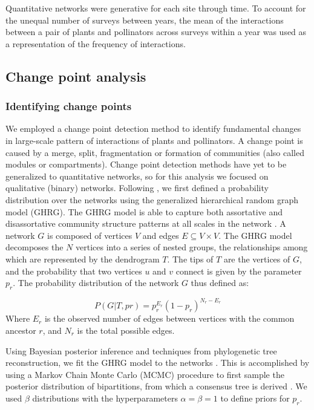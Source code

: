 \documentclass[12pt]{article}
\begin{document}
Quantitative networks were generative for each site through time. To
account for the unequal number of surveys between years, the mean of
the interactions between a pair of plants and pollinators across
surveys within a year was used as a representation of the frequency of
interactions.

\subsection*{Change point analysis}
\subsubsection*{Identifying change points}
We employed a change point detection method \citep{peel2014detecting}
to identify fundamental changes in large-scale pattern of interactions
of plants and pollinators. A change point is caused by a merge, split,
fragmentation or formation of communities (also called modules or
compartments). Change point detection methods have yet to be
generalized to quantitative networks, so for this analysis we focused
on qualitative (binary) networks. Following \cite{peel2014detecting},
we first defined a probability distribution over the networks using
the generalized hierarchical random graph model (GHRG). The GHRG model
is able to capture both assortative and disassortative community
structure patterns at all scales in the network
\citep{peel2014detecting}. A network $G$ is composed of vertices $V$
and edges $E \subseteq {V × V }$. The GHRG model decomposes the $N$
vertices into a series of nested groups, the relationships among which
are represented by the dendrogram $T$. The tips of $T$ are the
vertices of $G$, and the probability that two vertices $u$ and $v$
connect is given by the parameter $p_r$. The probability distribution
of the network $G$ thus defined as:

\begin{equation}
  \label{eq:lik}
  P(G|T,{pr}) = p_r^{E_r}(1-p_r)^{N_r-E_r}
\end{equation}
% 
Where $E_r$ is the observed number of edges between vertices with the
common ancestor $r$, and $N_r$ is the total possible edges.

Using Bayesian posterior inference and techniques from phylogenetic
tree reconstruction, we fit the GHRG model to the networks
\citep{peel2014detecting}. This is accomplished by using a Markov
Chain Monte Carlo (MCMC) procedure to first sample the posterior
distribution of bipartitions, from which a consensus tree is derived
\citep{peel2014detecting}. We used $\beta$ distributions with the
hyperparameters $\alpha=\beta=1$ to define priors for $p_r$.
\end{document}
